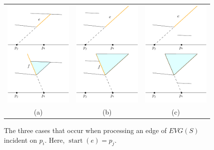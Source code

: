 \documentclass{patmorin}
\newcommand{\EVG}{\mathit{EVG}}
\DeclareMathOperator{\start}{start}
\begin{document}
\begin{figure}[bth]
  \begin{center}
    \begin{tabular}{|c|c|c|}
      \includegraphics[width=3.8cm]{case-a} &
      \includegraphics[width=3.8cm]{case-b} &
      \includegraphics[width=3.8cm]{case-c} \\
      (a) & (b) & (c)
    \end{tabular}
  \end{center}
  \caption{The three cases that occur when processing an edge of $\EVG(S)$
incident on $p_i$.  Here, $\start(e)=p_j$.}
\end{figure}
\end{document}
